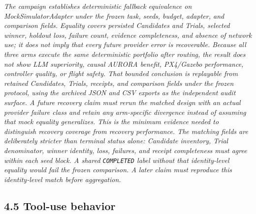 \emph{The campaign establishes deterministic fallback equivalence on
MockSimulatorAdapter under the frozen task, seeds, budget, adapter, and
comparison fields. Equality covers persisted Candidates and Trials,
selected winner, holdout loss, failure count, evidence completeness, and
absence of network use; it does not imply that every future provider
error is recoverable. Because all three arms execute the same
deterministic portfolio after routing, the result does not show LLM
superiority, causal AURORA benefit, PX4/Gazebo performance,
controller quality, or flight safety. That bounded conclusion is
replayable from retained Candidates, Trials, receipts, and comparison
fields under the frozen protocol, using the archived JSON and CSV exports
as the independent audit surface. A future recovery claim must rerun the
matched design with an actual provider failure class and retain any
arm-specific divergence instead of assuming that mock equality
generalizes. This is the minimum evidence needed to distinguish recovery
coverage from recovery performance. The matching fields are deliberately
stricter than terminal status alone: Candidate inventory, Trial
denominator, winner identity, loss, failures, and receipt completeness
must agree within each seed block. A shared \texttt{COMPLETED} label
without that identity-level equality would fail the frozen comparison. A
later claim must reproduce this identity-level match before aggregation.}

\subsection{\texorpdfstring{\textbf{4.5 Tool-use
behavior}}{4.5 Tool-use behavior}}\label{tool-use-behavior}

